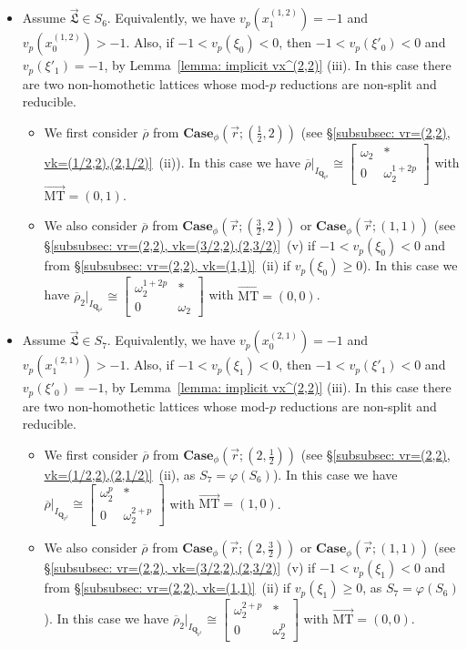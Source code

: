 \documentclass[11pt]{amsart}
\theoremstyle{definition}
\numberwithin{equation}{subsection}
\theoremstyle{plain}
\theoremstyle{plain}
\theoremstyle{plain}
\theoremstyle{plain}
\theoremstyle{plain}
\theoremstyle{plain}
\theoremstyle{plain}
\theoremstyle{plain}
\theoremstyle{plain}
\theoremstyle{plain}
\theoremstyle{plain}
\theoremstyle{plain}
\theoremstyle{definition}
\theoremstyle{definition}
\theoremstyle{definition}
\theoremstyle{remark}
\renewcommand{\(}{\textup{(}}
\renewcommand{\)}{\textup{)}}
\newcommand{\Q}{\mathbf{Q}}
\newcommand{\rhobar}{\overline{\rho}}
\newcommand{\fL}{\mathfrak{L}}
\newcommand{\vr}{\vec{r}}
\newcommand{\vL}{\vec{\fL}}
\newcommand{\IQptwo}{{I_{\Q_{p^2}}}}
\begin{document}
\begin{itemize}[leftmargin=*]
\item Assume $\vL\in S_6$. Equivalently, we have $v_p(x_1^{(1,2)})=-1$ and $v_p(x_0^{(1,2)})>-1$. Also, if $-1<v_p(\xi_0)<0$, then $-1<v_p(\xi'_0)<0$ and $v_p(\xi'_1)=-1$, by Lemma~\ref{lemma: implicit vx^(2,2)} (iii). In this case there are two non-homothetic lattices whose mod-$p$ reductions are non-split and reducible.
    \begin{itemize}[leftmargin=*]
    \item We first consider $\rhobar$ from $\mathbf{Case}_\phi(\vr;(\frac{1}{2},2))$ (see \S\ref{subsubsec: vr=(2,2), vk=(1/2,2),(2,1/2)}~(ii)). In this case we have $\rhobar|_\IQptwo\cong
    \begin{bmatrix}
        \omega_2 & * \\ 0 & \omega_2^{1+2p}
    \end{bmatrix}$ with $\vec{\mathrm{MT}}=(0,1)$.
    \item We also consider $\rhobar$ from  $\mathbf{Case}_\phi(\vr;(\frac{3}{2},2))$ or $\mathbf{Case}_\phi(\vr;(1,1))$ (see \S\ref{subsubsec: vr=(2,2), vk=(3/2,2),(2,3/2)}~(v) if $-1<v_p(\xi_0)<0$ and from \S\ref{subsubsec: vr=(2,2), vk=(1,1)}~(ii) if $v_p(\xi_0)\geq 0$). In this case we have $\rhobar_2|_\IQptwo\cong
    \begin{bmatrix}
        \omega_2^{1+2p} & * \\ 0 & \omega_2
    \end{bmatrix}$ with $\vec{\mathrm{MT}}=(0,0)$.
    \end{itemize}

\item Assume $\vL\in S_7$. Equivalently, we have $v_p(x_0^{(2,1)})=-1$ and $v_p(x_1^{(2,1)})>-1$. Also, if $-1<v_p(\xi_1)<0$, then $-1<v_p(\xi'_1)<0$ and $v_p(\xi'_0)=-1$, by Lemma~\ref{lemma: implicit vx^(2,2)} (iii). In this case there are two non-homothetic lattices whose mod-$p$ reductions are non-split and reducible.
    \begin{itemize}[leftmargin=*]
    \item We first consider $\rhobar$ from $\mathbf{Case}_\phi(\vr;(2,\frac{1}{2}))$ (see \S\ref{subsubsec: vr=(2,2), vk=(1/2,2),(2,1/2)}~(ii), as $S_7=\varphi(S_6)$). In this case we have $\rhobar|_\IQptwo\cong
    \begin{bmatrix}
        \omega_2^p & * \\ 0 & \omega_2^{2+p}
    \end{bmatrix}$ with $\vec{\mathrm{MT}}=(1,0)$.
    \item We also consider $\rhobar$ from $\mathbf{Case}_\phi(\vr;(2,\frac{3}{2}))$ or $\mathbf{Case}_\phi(\vr;(1,1))$ (see \S\ref{subsubsec: vr=(2,2), vk=(3/2,2),(2,3/2)}~(v) if $-1<v_p(\xi_1)<0$ and from \S\ref{subsubsec: vr=(2,2), vk=(1,1)}~(ii) if $v_p(\xi_1)\geq 0$, as $S_7=\varphi(S_6)$). In this case we have $\rhobar_2|_\IQptwo\cong
    \begin{bmatrix}
        \omega_2^{2+p} & * \\ 0 & \omega_2^p
    \end{bmatrix}$ with $\vec{\mathrm{MT}}=(0,0)$.
    \end{itemize}


\end{itemize}
\end{document}
